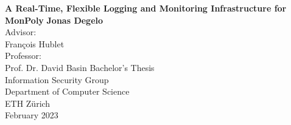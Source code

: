 \begin{titlepage}
    \begin{center}
        \vspace*{1cm}
        \Huge
        \textbf{A Real-Time, Flexible Logging and Monitoring Infrastructure for MonPoly}
        \vspace{0.5cm}
        \LARGE
        \vspace{1.5cm}
        \textbf{Jonas Degelo} \\
        \vspace{1.5cm}
        Advisor: \\
        François Hublet \\

        Professor: \\
        Prof. Dr. David Basin
        \vfill
        Bachelor's Thesis \\
        \vspace{0.8cm}
        \Large
        Information Security Group\\
        Department of Computer Science\\
        ETH Zürich\\
        February 2023
    \end{center}
\end{titlepage}